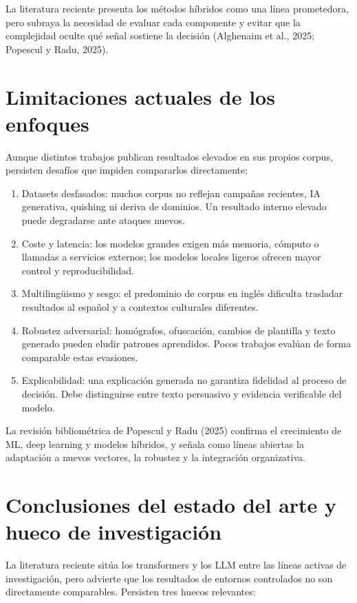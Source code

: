 \documentclass[11pt,a4paper,oneside]{report}
\begin{document}
La literatura reciente presenta los métodos híbridos como una línea prometedora, pero subraya la necesidad de evaluar cada componente y evitar que la complejidad oculte qué señal sostiene la decisión (Alghenaim et al., 2025; Popescul y Radu, 2025).

\section{Limitaciones actuales de los enfoques}

Aunque distintos trabajos publican resultados elevados en sus propios corpus, persisten desafíos que impiden compararlos directamente:

\begin{enumerate}
  \item Datasets desfasados: muchos corpus no reflejan campañas recientes, IA generativa, quishing ni deriva de dominios. Un resultado interno elevado puede degradarse ante ataques nuevos.
  \item Coste y latencia: los modelos grandes exigen más memoria, cómputo o llamadas a servicios externos; los modelos locales ligeros ofrecen mayor control y reproducibilidad.
  \item Multilingüismo y sesgo: el predominio de corpus en inglés dificulta trasladar resultados al español y a contextos culturales diferentes.
  \item Robustez adversarial: homógrafos, ofuscación, cambios de plantilla y texto generado pueden eludir patrones aprendidos. Pocos trabajos evalúan de forma comparable estas evasiones.
  \item Explicabilidad: una explicación generada no garantiza fidelidad al proceso de decisión. Debe distinguirse entre texto persuasivo y evidencia verificable del modelo.
\end{enumerate}

La revisión bibliométrica de Popescul y Radu (2025) confirma el crecimiento de ML, deep learning y modelos híbridos, y señala como líneas abiertas la adaptación a nuevos vectores, la robustez y la integración organizativa.

\section{Conclusiones del estado del arte y hueco de investigación}

La literatura reciente sitúa los transformers y los LLM entre las líneas activas de investigación, pero advierte que los resultados de entornos controlados no son directamente comparables. Persisten tres huecos relevantes:
\end{document}
